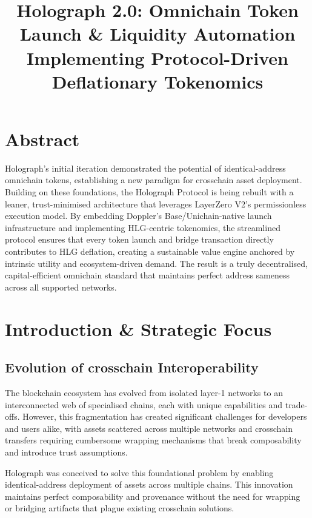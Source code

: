 \documentclass[10pt,a4paper,twocolumn]{article}
\title{Holograph 2.0: Omnichain Token Launch \& Liquidity Automation\\[0.5em]
\large Implementing Protocol-Driven Deflationary Tokenomics}
\author{}
\date{}
\begin{document}
\maketitle

\section*{Abstract}
Holograph's initial iteration demonstrated the potential of identical-address omnichain tokens, establishing a new paradigm for crosschain asset deployment. Building on these foundations, the Holograph Protocol is being rebuilt with a leaner, trust-minimised architecture that leverages LayerZero V2's permissionless execution model. By embedding Doppler's Base/Unichain-native launch infrastructure and implementing HLG-centric tokenomics, the streamlined protocol ensures that every token launch and bridge transaction directly contributes to HLG deflation, creating a sustainable value engine anchored by intrinsic utility and ecosystem-driven demand. The result is a truly decentralised, capital-efficient omnichain standard that maintains perfect address sameness across all supported networks.

\section{Introduction \& Strategic Focus}
\subsection{Evolution of crosschain Interoperability}
The blockchain ecosystem has evolved from isolated layer-1 networks to an interconnected web of specialised chains, each with unique capabilities and trade-offs. However, this fragmentation has created significant challenges for developers and users alike, with assets scattered across multiple networks and crosschain transfers requiring cumbersome wrapping mechanisms that break composability and introduce trust assumptions.

Holograph was conceived to solve this foundational problem by enabling identical-address deployment of assets across multiple chains. This innovation maintains perfect composability and provenance without the need for wrapping or bridging artifacts that plague existing crosschain solutions.
\end{document}
